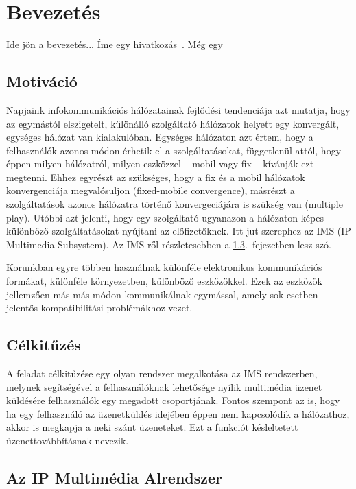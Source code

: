 
\section{Bevezetés}

Ide jön a bevezetés... Íme egy hivatkozás~\cite{KonyvId}. Még egy~\cite{sds_tech_desc}

\subsection{Motiváció}

Napjaink infokommunikációs hálózatainak fejlődési tendenciája azt mutatja, hogy az egymástól elszigetelt,
különálló szolgáltató hálózatok helyett egy konvergált, egységes hálózat van kialakulóban. Egységes hálózaton azt értem, hogy a felhasználók azonos módon érhetik el a szolgáltatásokat, függetlenül attól, hogy éppen milyen hálózatról, milyen eszközzel -- mobil vagy fix -- kívánják ezt megtenni. Ehhez egyrészt az szükséges, hogy a fix és a mobil hálózatok konvergenciája megvalósuljon (fixed-mobile convergence), másrészt a szolgáltatások azonos hálózatra történő konvergeciájára is szükség van (multiple play). Utóbbi azt jelenti, hogy egy szolgáltató ugyanazon a hálózaton képes különböző szolgáltatásokat nyújtani az előfizetőknek. Itt jut szerephez az IMS (IP Multimedia Subsystem). Az IMS-ről részletesebben a \ref{sec:ims}.~fejezetben lesz szó.

Korunkban egyre többen használnak különféle elektronikus kommunikációs formákat, különféle környezetben, különböző eszközökkel. Ezek az eszközök jellemzően más-más módon kommunikálnak egymással, amely sok esetben jelentős kompatibilitási problémákhoz vezet.

\subsection{Célkitűzés}

A feladat célkitűzése egy olyan rendszer megalkotása az IMS rendszerben, melynek
segítségével a felhasználóknak lehetősége nyílik multimédia üzenet küldésére felhasználók egy megadott csoportjának. Fontos szempont az is, hogy ha egy felhasználó az üzenetküldés idejében éppen nem kapcsolódik a hálózathoz, akkor is megkapja a neki szánt üzeneteket. Ezt a funkciót késleltetett üzenettovábbításnak nevezik.

\subsection{Az IP Multimédia Alrendszer}
\label{sec:ims}

